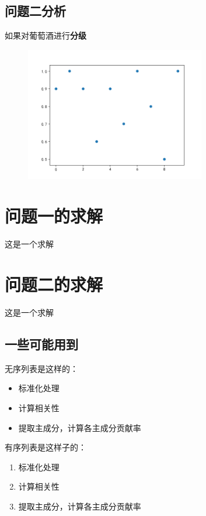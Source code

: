 \documentclass{cumcmthesis}
\begin{document}
	\subsection{问题二分析}
	如果对葡萄酒进行\textbf{分级}
	
		\begin{figure}[H] %
			\centering %
			\includegraphics[width=0.7\textwidth]{Acc1.png} %
		\end{figure}
	
		

\section{问题一的求解}

这是一个求解

\section{问题二的求解}
这是一个求解

\subsection{一些可能用到}

无序列表是这样的：
\begin{itemize}
	\item 标准化处理
	\item 计算相关性
	\item 提取主成分，计算各主成分贡献率
\end{itemize}

有序列表是这样子的：
\begin{enumerate}
	\item 标准化处理
	\item 计算相关性
	\item 提取主成分，计算各主成分贡献率
\end{enumerate}
\end{document}

